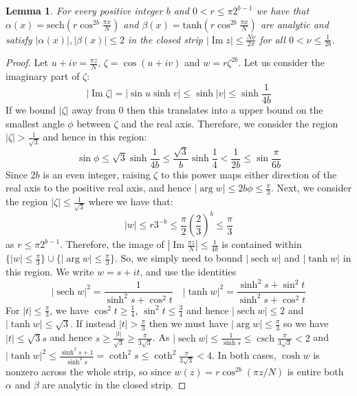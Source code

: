 \documentclass[aps,floatfix,10pt,amssymb,amsfont,amsmath,superscriptaddress,float,nofootinbib,longbibliography,nobalancelastpage,twocolumn]{revtex4-2}
\newtheorem{lemma}{Lemma}
\begin{document}
\begin{lemma}
    For every positive integer $b$ and $0 < r \leq \pi2^{b-1}$ we have that $\alpha(x)= \text{sech}( r\cos^{2b} \frac{\pi x}{N})$ and $\beta(x) = \text{tanh}(r \cos^{2b} \frac{\pi x}{N})$ are analytic and satisfy $|\alpha(x)|, |\beta(x)| \leq 2$ in the closed strip $| \operatorname{Im} z| \leq \frac{N\nu}{2\pi}$ for all $0 < \nu \leq \frac{1}{2b}$. 
    \label{lemma:appendixc}
\end{lemma}
\begin{proof}
    Let $u + iv = \frac{\pi z}{N}$, $\zeta = \cos (u+iv)$ and $w = r \zeta^{2b}$. Let us consider the imaginary part of $\zeta$:
    \begin{equation}
        |\operatorname{Im} \zeta |  = | \sin u \sinh v | \leq \sinh |v|  \leq \sinh \frac{1}{4b}
    \end{equation}
    If we bound $|\zeta|$ away from $0$ then this translates into a upper bound on the smallest angle $\phi$ between $\zeta$ and the real axis. Therefore, we consider the region $| \zeta | > \frac{1}{\sqrt{3}}$ and hence in this region:
    \begin{equation}
       \sin \phi  \leq \sqrt{3}\sinh \frac{1}{4b} \leq \frac{\sqrt{3}}{b} \sinh\frac{1}{4} < \frac{1}{2b} \leq \sin \frac{\pi}{6b}
    \end{equation}
    Since $2b$ is an even integer, raising $\zeta$ to this power maps either direction of the real axis to the positive real axis, and hence $|\arg w|\le2b\phi\le \frac{\pi}{3}$. Next, we consider the region $|\zeta| \leq \frac{1}{\sqrt{3}}$ where we have that:
    \begin{equation}
        |w| \leq r 3^{-b}\leq \frac{\pi}{2}\left(\frac{2}{3}\right)^b \leq \frac{\pi}{3}
    \end{equation}
    as $r \leq \pi2^{b-1}$. Therefore, the image of $| \operatorname{Im} \frac{\pi z}{N}| \leq \frac{1}{4b}$ is contained within $\{ |w| \leq \frac{\pi}{3}\} \cup \{|\arg w| \leq \frac{\pi}{3}\}$. So, we simply need to bound $|\operatorname{sech} w|$ and $|\operatorname{tanh} w|$ in this region. We write $w = s + it$, and use the identities
    \begin{equation}
        |\operatorname{sech} w|^2 = \frac{1}{\sinh^2 s + \cos^2 t} \quad |\operatorname{tanh} w|^2 = \frac{\sinh^2 s + \sin^2 t}{\sinh^2 s + \cos^2 t}
    \end{equation}
    For $|t| \leq \frac{\pi}{3}$, we have $\cos^2 t \geq \frac{1}{4}$, $\sin^2 t \leq \frac{3}{4}$ and hence $|\operatorname{sech} w| \leq 2$ and $|\operatorname{tanh} w| \leq \sqrt{3}$. If instead $|t| > \frac{\pi}{3}$ then we must have $|\arg w| \leq \frac{\pi}{3}$ so we have $|t| \leq \sqrt{3}s$ and hence $s \geq \frac{|t|}{\sqrt{3}} \geq \frac{\pi}{3\sqrt{3}}$. As $|\operatorname{sech} w| \leq \frac{1}{\sinh s} \leq \operatorname{csch} \frac{\pi}{3\sqrt{3}} < 2$ and $|\tanh w|^2 \leq \frac{\sinh^2 s +1}{\sinh^2 s} = \operatorname{coth}^2 s \leq \operatorname{coth}^2 \frac{\pi}{3\sqrt{3}} < 4$. In both cases, $\cosh w$ is nonzero across the whole strip, so since $w(z)=r\cos^{2b}(\pi z/N)$ is entire both $\alpha$ and $\beta$ are analytic in the closed strip.
\end{proof}
\end{document}
